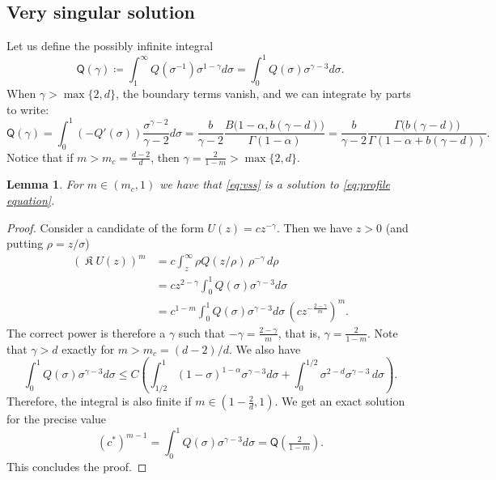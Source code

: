 \documentclass[a4paper]{article}
\newtheorem{lemma}[theorem]{Lemma}
\theoremstyle{definition}
\DeclareMathOperator{\fixedpoint}{\mathfrak K}
\begin{document}
%
%
%
%
%
%
%
%
%
%

%
%
%
%
%
%
%
%
%
%
%
%
%
%
%
%
%
%

%
\subsection{Very singular solution}
Let us define the possibly infinite integral
\[
\mathsf Q(\gamma) \coloneqq \int_1^\infty Q(\sigma^{-1}) \sigma^{1-\gamma} d \sigma = \int_0^1 Q(\sigma) \sigma^{\gamma - 3} d \sigma.
\]
When $\gamma > \max\{2,d\}$, the boundary terms vanish, and we can integrate by parts to write:
\begin{equation}
\label{eq:mathsf Q}
\mathsf Q(\gamma) = \int_0^1 (-Q'(\sigma)) \frac{\sigma^{\gamma - 2}}{\gamma - 2} d \sigma = \frac{b}{\gamma - 2} \frac{B\Big( 1-\alpha, b(\gamma-d) \Big)}{\Gamma(1-\alpha)}= \frac{b}{\gamma - 2} \frac{\Gamma\Big( b(\gamma-d) \Big)}{\Gamma(1-\alpha + b(\gamma-d))}.
\end{equation}
Notice that if $m > m_c = \frac{d-2}{d}$, then $\gamma = \frac{2}{1-m} > \max\{2,d\}$.

\begin{lemma}
\label{lem:vss}
For $m \in (m_c,1)$ we have that \eqref{eq:vss} is a solution to \eqref{eq:profile equation}.
\end{lemma}
\begin{proof}
Consider a candidate of the form $U(z) = c z^{-\gamma}$. Then we have $z > 0$ (and putting $\rho=z/\sigma$)
\begin{align*}
  (\fixedpoint U(z))^m & = c \int_z^\infty \rho Q(z/\rho)\, {\rho ^{-\gamma}} \,d \rho       \\
  & =   c z^{2-\gamma} {\int_0^1 Q(\sigma) \sigma^{\gamma-3} d \sigma } \\
  & = c^{1-m} \int_0^1 Q(\sigma) \sigma^{\gamma-3} d \sigma
  \, (c z^{-\frac{2 - \gamma}m})^m.
\end{align*}
The correct power is therefore a $\gamma$ such that $-\gamma = \frac{2-\gamma}{m}$, that is, $\gamma = \frac{2}{1-m}$. Note that $\gamma>d$ exactly for $m> m_c=(d-2)/d$. We also have
%
\begin{equation*}
  { \int_0^1 Q(\sigma) \sigma^{\gamma-3} d \sigma \le C \left( \int_{1/2}^1  (1-\sigma)^{1-\alpha} \sigma^{\gamma-3} d \sigma + \int_0^{1/2} \sigma^{2-d} \sigma^{\gamma-3}\,d\sigma \right).}
\end{equation*}
Therefore, the integral is also finite if $m \in (1-\frac 2 d,1)$. We get an exact solution for the precise value
\[
  (c^*)^{m-1}= \int_0^1 Q(\sigma) \sigma^{\gamma-3} d \sigma= \mathsf Q(\tfrac{2}{1-m}).
\]
This concludes the proof.
\end{proof}
\end{document}
